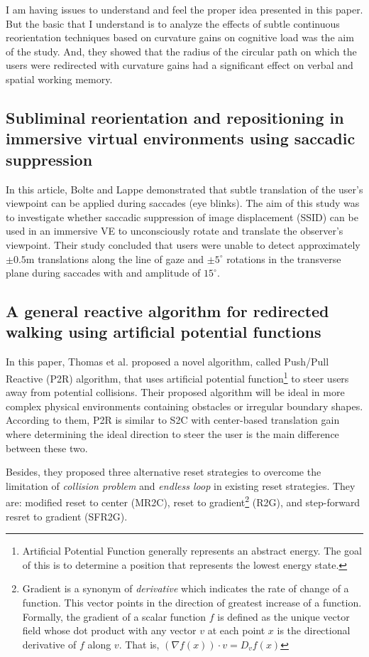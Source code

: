 \documentclass[12pt]{article}
\begin{document}
I am having issues to understand and feel the proper idea presented in this paper. But the basic that I understand is to analyze the effects of subtle continuous reorientation techniques based on curvature gains on cognitive load was the aim of the study. And, they showed that the radius of the circular path on which the users were redirected with curvature gains had a significant effect on verbal and spatial working memory.

\subsection{Subliminal reorientation and repositioning in immersive virtual environments using saccadic suppression}
\textbf{\cite{bolte2015subliminal}}

In this article, Bolte and Lappe demonstrated that subtle translation of the user's viewpoint can be applied during saccades (eye blinks). The aim of this study was to investigate whether saccadic suppression of image displacement (SSID) can be used in an immersive VE to unconsciously rotate and translate the observer's viewpoint. Their study concluded that users were unable to detect approximately $\pm 0.5$m translations along the line of gaze and $\pm 5^{\circ}$ rotations in the transverse plane during saccades with and amplitude of $15^{\circ}$.

\subsection{A general reactive algorithm for redirected walking using artificial potential functions}
\textbf{\cite{thomas2019general}}

In this paper, Thomas et al. proposed a novel algorithm, called Push/Pull Reactive (P2R) algorithm, that uses artificial potential function\footnote{Artificial Potential Function generally represents an abstract energy. The goal of this is to determine a position that represents the lowest energy state.} to steer users away from potential collisions. Their proposed algorithm will be ideal in more complex physical environments containing obstacles or irregular boundary shapes. According to them, P2R is similar to S2C with center-based translation gain where determining the ideal direction to steer the user is the main difference between these two.


Besides, they proposed three alternative reset strategies to overcome the limitation of \emph{collision problem} and \emph{endless loop} in existing reset strategies. They are: modified reset to center (MR2C), reset to gradient\footnote{Gradient is a synonym of \emph{derivative} which indicates the rate of change of a function. This vector points in the direction of greatest increase of a function. Formally, the gradient of a scalar function $f$ is defined as the unique vector field whose dot product with any vector $v$ at each point $x$ is the directional derivative of $f$ along $v$. That is, $(\nabla f(x)) \cdot v = D_vf(x)$} (R2G), and step-forward resret to gradient (SFR2G).
\end{document}
